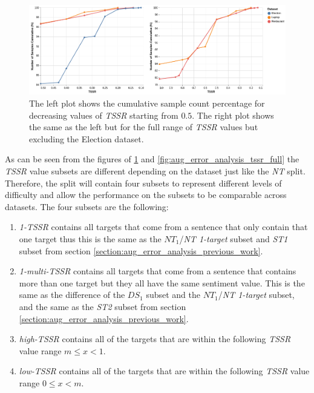 \begin{figure}[!ht]
    \centering
    \includegraphics[scale=0.4]{images/augmentation/error_analysis/tssr_small_range.png}
    \caption{The left plot shows the cumulative sample count percentage for decreasing values of \textit{TSSR} starting from $0.5$. The right plot shows the same as the left but for the full range of \textit{TSSR} values but excluding the Election dataset.}
    \label{fig:aug_error_analysis_tssr_small}
\end{figure}

As can be seen from the figures of \ref{fig:aug_error_analysis_tssr_small} and \ref{fig:aug_error_analysis_tssr_full} the \textit{TSSR} value subsets are different depending on the dataset just like the \textit{NT} split. Therefore, the split will contain four subsets to represent different levels of difficulty and allow the performance on the subsets to be comparable across datasets. The four subsets are the following:

\begin{enumerate}
    \item \textit{1-TSSR} contains all targets that come from a sentence that only contain that one target thus this is the same as the $NT_1$/\textit{NT 1-target} subset and \textit{ST1} subset from section \ref{section:aug_error_analysis_previous_work}. 
    \item \textit{1-multi-TSSR} contains all targets that come from a sentence that contains more than one target but they all have the same sentiment value. This is the same as the difference of the $DS_1$ subset and the $NT_1$/\textit{NT 1-target} subset, and the same as the \textit{ST2} subset from section \ref{section:aug_error_analysis_previous_work}.
    \item \textit{high-TSSR} contains all of the targets that are within the following \textit{TSSR} value range $m \le x < 1$. 
    \item \textit{low-TSSR} contains all of the targets that are within the following \textit{TSSR} value range $0 \le x < m$.
\end{enumerate}

